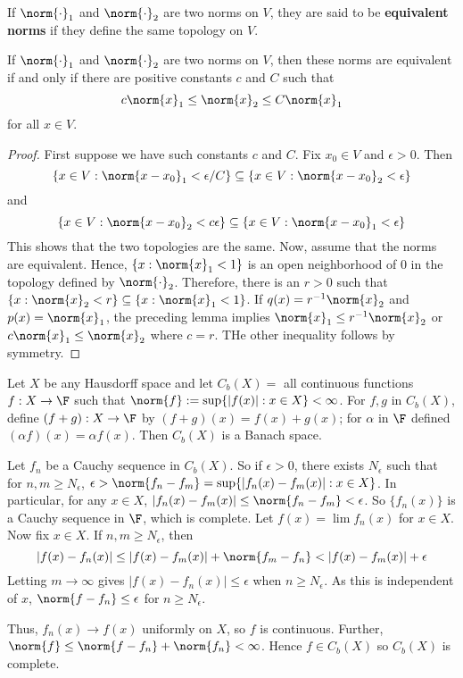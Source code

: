 If $\norm{\cdot}_1$ and $\norm{\cdot}_2$ are two norms on $V$, they are said to be \textbf{equivalent norms} if they define the same topology on $V$.

\begin{prop}
    If $\norm{\cdot}_1$ and $\norm{\cdot}_2$ are two norms on $V$, then these norms are equivalent if and only if there are positive constants $c$ and $C$ such that $$c\norm{x}_1 \leq \norm{x}_2 \leq C\norm{x}_1$$
    for all $x \in V$.
\end{prop}
\begin{proof}
    First suppose we have such constants $c$ and $C$. Fix $x_0 \in V$ and $\epsilon > 0$. Then $$\{x \in V:\norm{x-x_0}_1 < \epsilon/C\} \subseteq \{x \in V:\norm{x-x_0}_2 < \epsilon\}$$
    and $$\{x\in V:\norm{x-x_0}_2 < c\epsilon\} \subseteq \{x \in V:\norm{x-x_0}_1 < \epsilon\}$$
    This shows that the two topologies are the same. Now, assume that the norms are equivalent. Hence, $\{x:\norm{x}_1 < 1\}$ is an open neighborhood of $0$ in the topology defined by $\norm{\cdot}_2$. Therefore, there is an $r > 0$ such that $\{x:\norm{x}_2 < r\} \subseteq \{x:\norm{x}_1 < 1\}$. If $q(x) = r^{-1}\norm{x}_2$ and $p(x) = \norm{x}_1$, the preceding lemma implies $\norm{x}_1 \leq r^{-1}\norm{x}_2$ or $c\norm{x}_1 \leq \norm{x}_2$ where $c = r$. THe other inequality follows by symmetry.
\end{proof}

\begin{eg}
    Let $X$ be any Hausdorff space and let $C_b(X) = $ all continuous functions $f:X\rightarrow \F$ such that $\norm{f} := \sup\{|f(x)|:x \in X\} < \infty$. For $f,g$ in $C_b(X)$, define $(f+g):X\rightarrow \F$ by $(f+g)(x) = f(x) + g(x)$; for $\alpha$ in $\F$ defined $(\alpha f)(x) = \alpha f(x)$. Then $C_b(X)$ is a Banach space.

    Let $f_n$ be a Cauchy sequence in $C_b(X)$. So if $\epsilon > 0$, there exists $N_{\epsilon}$ such that for $n,m \geq N_{\epsilon}$, $\epsilon > \norm{f_n-f_m} = \sup\{|f_n(x) - f_m(x)|:x \in X\}$. In particular, for any $x \in X$, $|f_n(x) - f_m(x)| \leq \norm{f_n-f_m} < \epsilon$. So $\{f_n(x)\}$ is a Cauchy sequence in $\F$, which is complete. Let $f(x) = \lim f_n(x)$ for $x \in X$. Now fix $x \in X$. If $n,m \geq N_{\epsilon}$, then $$|f(x) - f_n(x)| \leq |f(x) - f_m(x)| + \norm{f_m-f_n} < |f(x)-f_m(x)| + \epsilon$$
    Letting $m\rightarrow \infty$ gives $|f(x) - f_n(x)| \leq \epsilon$ when $n \geq N_{\epsilon}$. As this is independent of $x$, $\norm{f-f_n} \leq \epsilon$ for $n \geq N_{\epsilon}$.

    Thus, $f_n(x)\rightarrow f(x)$ uniformly on $X$, so $f$ is continuous. Further, $\norm{f} \leq \norm{f-f_n}+\norm{f_n} < \infty$. Hence $f \in C_b(X)$ so $C_b(X)$ is complete.
\end{eg}

